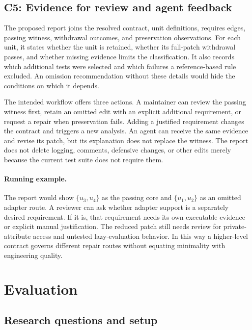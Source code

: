\documentclass[a4paper,fleqn]{cas-sc}
\begin{document}
\subsection{C5: Evidence for review and agent feedback}\label{sec:review}

The proposed report joins the resolved contract, unit definitions, requires edges, passing witness, withdrawal outcomes, and preservation observations. For each unit, it states whether the unit is retained, whether its full-patch withdrawal passes, and whether missing evidence limits the classification. It also records which additional tests were selected and which failures a reference-based rule excluded. An omission recommendation without these details would hide the conditions on which it depends.

The intended workflow offers three actions. A maintainer can review the passing witness first, retain an omitted edit with an explicit additional requirement, or request a repair when preservation fails. Adding a justified requirement changes the contract and triggers a new analysis. An agent can receive the same evidence and revise its patch, but its explanation does not replace the witness. The report does not delete logging, comments, defensive changes, or other edits merely because the current test suite does not require them.

\paragraph{Running example.}
The report would show $\{u_3,u_4\}$ as the passing core and $\{u_1,u_2\}$ as an omitted adapter route. A reviewer can ask whether adapter support is a separately desired requirement. If it is, that requirement needs its own executable evidence or explicit manual justification. The reduced patch still needs review for private-attribute access and untested lazy-evaluation behavior. In this way a higher-level contract governs different repair routes without equating minimality with engineering quality.

\section{Evaluation}\label{sec:evaluation}

\subsection{Research questions and setup}\label{sec:setup}
\end{document}
